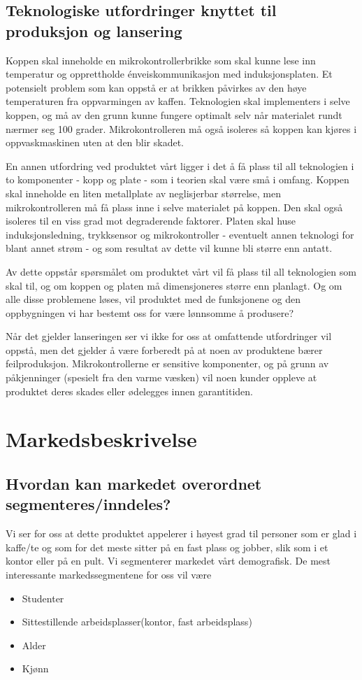 \subsection{Teknologiske utfordringer knyttet til produksjon og lansering}
Koppen skal inneholde en mikrokontrollerbrikke som skal kunne lese inn temperatur og opprettholde énveiskommunikasjon med induksjonsplaten. Et potensielt problem som kan oppstå er at brikken påvirkes av den høye temperaturen fra oppvarmingen av kaffen. Teknologien skal implementers i selve koppen, og må av den grunn kunne fungere optimalt selv når materialet rundt nærmer seg 100 grader. Mikrokontrolleren må også isoleres så koppen kan kjøres i oppvaskmaskinen uten at den blir skadet.

En annen utfordring ved produktet vårt ligger i det å få plass til all teknologien i to komponenter - kopp og plate - som i teorien skal være små i omfang. Koppen skal inneholde en liten metallplate av neglisjerbar størrelse, men mikrokontrolleren må få plass inne i selve materialet på koppen. Den skal også isoleres til en viss grad mot degraderende faktorer. Platen skal huse induksjonsledning, trykksensor og mikrokontroller - eventuelt annen teknologi for blant annet strøm - og som resultat av dette vil kunne bli større enn antatt. 

Av dette oppstår spørsmålet om produktet vårt vil få plass til all teknologien som skal til, og om koppen og platen må dimensjoneres større enn planlagt. Og om alle disse problemene løses, vil produktet med de funksjonene og den oppbygningen vi har bestemt oss for være lønnsomme å produsere?

Når det gjelder lanseringen ser vi ikke for oss at omfattende utfordringer vil oppstå, men det gjelder å være forberedt på at noen av produktene bærer feilproduksjon. Mikrokontrollerne er sensitive komponenter, og på grunn av påkjenninger (spesielt fra den varme væsken) vil noen kunder oppleve at produktet deres skades eller ødelegges innen garantitiden.

\section{Markedsbeskrivelse}
\subsection{Hvordan kan markedet overordnet segmenteres/inndeles?}
Vi ser for oss at dette produktet appelerer i høyest grad til personer som er glad i kaffe/te og som for det meste sitter på en fast plass og jobber, slik som i et kontor eller på en pult. Vi segmenterer markedet vårt demografisk. De mest interessante markedssegmentene for oss vil være 

\begin{itemize}
	\item Studenter
	\item Sittestillende arbeidsplasser(kontor, fast arbeidsplass)
	\item Alder
	\item Kjønn
\end{itemize}